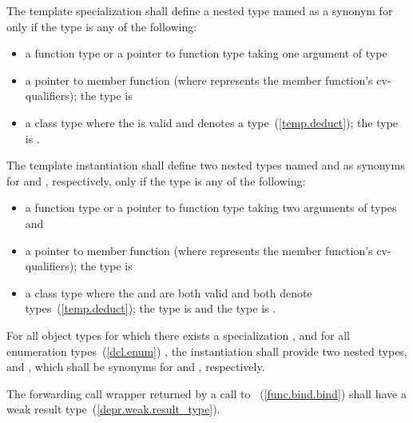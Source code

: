 \pnum
The template specialization 
shall define a nested type named 
as a synonym for 
only if the type  is any of the following:
\begin{itemize}
\item a function type or a pointer to function type taking one argument of type 
\item a pointer to member function  \cv{} (where \cv{} represents the member function's cv-qualifiers); the type  is \cv{} 
\item a class type where the  
is valid and denotes a type~(\ref{temp.deduct});
the type  is .
\end{itemize}

\pnum
The template instantiation 
shall define two nested types
named  and 
as synonyms for  and , respectively,
only if the type  is any of the following:
\begin{itemize}
\item a function type or a pointer to function type taking two arguments of types  and 
\item a pointer to member function  \cv{} (where \cv{} represents the member function's cv-qualifiers); the type  is \cv{} 
\item a class type where the 
 and 
are both valid and both denote types~(\ref{temp.deduct});
the type  is  and
the type  is .
\end{itemize}

\pnum
For all object types  for which there exists a specialization ,
and for all enumeration types~(\ref{dcl.enum}) ,
the instantiation  shall provide two nested types,
 and ,
which shall be synonyms for  and , respectively.

\pnum
The forwarding call wrapper 
returned by a call to ~(\ref{func.bind.bind})
shall have a weak result type~(\ref{depr.weak.result_type}).

